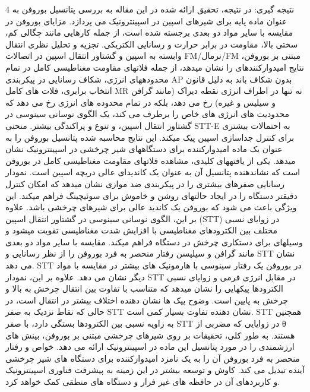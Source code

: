 4 نتیجه گیری: در نتیجه، تحقیق ارائه شده در این مقاله به بررسی پتانسیل بوروفن به عنوان ماده پایه برای شیرهای اسپین در اسپینترونیک می پردازد. مزایای بوروفن در مقایسه با سایر مواد دو بعدی برجسته شده است، از جمله کارهایی مانند چگالی کم، سختی بالا، مقاومت در برابر حرارت و رسانایی الکتریکی. تجزیه و تحلیل نظری انتقال وابسته به اسپین و گشتاور انتقال اسپین در اتصالات FM/نرمال/FM مبتنی بر بوروفن، نتایج امیدوارکنندهای را نشان میدهد، از جمله فلاتهای مقاومت مغناطیسی کامل در تمام محدودههای انرژی، شکاف رسانایی در پیکربندی AP بدون شکاف باند به دلیل قانون انتخاب برابری، فلات های کامل MR نه تنها در اطراف انرژی نقطه دیراک (مانند گرافن و سیلیس و غیره) رخ می دهد، بلکه در تمام محدوده های انرژی رخ می دهد که محدودیت های انرژی های خاص را برطرف می کند، یک الگوی نوسانی سینوسی در گشتاور انتقال اسپین، و تنوع و پراکندگی بیشتر. منحنی STT-E به احتمالات بیشتری برای کنترل جداسازی اسپین پیک میکند. این نتایج محاسبه شده پتانسیل بوروفن را به عنوان یک ماده امیدوارکننده برای دستگاههای شیر چرخشی در اسپینترونیک نشان میدهد. یکی از یافتههای کلیدی، مشاهده فلاتهای مقاومت مغناطیسی کامل در بوروفن است که نشاندهنده پتانسیل آن به عنوان یک کاندیدای عالی دریچه اسپین است. نمودار رسانایی صفرهای بیشتری را در پیکربندی ضد موازی نشان میدهد که امکان کنترل دقیقتر دستگاه را در ایجاد حالتهای روشن و خاموش برای سوئیچینگ فراهم میکند. این ویژگی باعث می شود که بوروفن یک کاندید عالی برای شیرهای چرخشی باشد. علاوه بر این، الگوی نوسانی سینوسی در گشتاور انتقال اسپین (STT) در زوایای نسبی مختلف بین الکترودهای مغناطیسی با افزایش شدت مغناطیسی تقویت میشود و وسیلهای برای دستکاری چرخش در دستگاه فراهم میکند. مقایسه با سایر مواد دو بعدی مانند گرافن و سیلیسن رفتار منحصر به فرد بوروفن را از نظر رسانایی و STT نشان می دهد. STT در بوروفن یک رفتار سینوسی با هارمونیک های بیشتر در مقایسه با مواد دیگر نشان می دهد. علاوه بر این، نمودار STT در مقابل انرژی فرمی و زوایای نسبی الکترودها پیکهایی را نشان میدهد که متناسب با تفاوت بین انتقال چرخش به بالا و چرخش به پایین است. وضوح پیک ها نشان دهنده اختلاف بیشتر در انتقال است، در حالی که نقاط نزدیک به صفر STT نشان دهنده تفاوت بسیار کمی است. STT همچنین به زاویه نسبی بین الکترودها بستگی دارد، با صفر STT در زوایایی که مضربی از θ هستند. به طور کلی، تحقیقات بر روی شیرهای چرخشی مبتنی بر بوروفن، بینش های ارزشمندی را در مورد پتانسیل این ماده در اسپینترونیک ارائه می دهد. خواص و رفتار منحصر به فرد بوروفن آن را به یک نامزد امیدوارکننده برای دستگاه های شیر چرخشی آینده تبدیل می کند. کاوش و توسعه بیشتر در این زمینه به پیشرفت فناوری اسپینترونیک و کاربردهای آن در حافظه های غیر فرار و دستگاه های منطقی کمک خواهد کرد.

% 
% 
